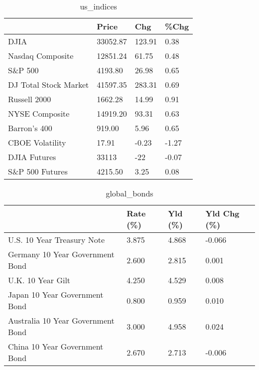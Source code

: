 \documentclass{article}%
\begin{document}
%


\begin{table}[htbp]%
\caption{us\_indices}%
\centering%
\begin{adjustbox}{width=1\textwidth}%
\begin{tabular}{llll}
\toprule
                      &    Price &    Chg &  \%Chg \\
\midrule
                 DJIA & 33052.87 & 123.91 &  0.38 \\
     Nasdaq Composite & 12851.24 &  61.75 &  0.48 \\
              S\&P 500 &  4193.80 &  26.98 &  0.65 \\
DJ Total Stock Market & 41597.35 & 283.31 &  0.69 \\
         Russell 2000 &  1662.28 &  14.99 &  0.91 \\
       NYSE Composite & 14919.20 &  93.31 &  0.63 \\
         Barron's 400 &   919.00 &   5.96 &  0.65 \\
      CBOE Volatility &    17.91 &  -0.23 & -1.27 \\
         DJIA Futures &    33113 &    -22 & -0.07 \\
      S\&P 500 Futures &  4215.50 &   3.25 &  0.08 \\
\bottomrule
\end{tabular}
%
\end{adjustbox}%
\end{table}

%


\begin{table}[htbp]%
\caption{global\_bonds}%
\centering%
\begin{adjustbox}{width=1\textwidth}%
\begin{tabular}{llll}
\toprule
                                  & Rate (\%) & Yld (\%) & Yld Chg (\%) \\
\midrule
       U.S. 10 Year Treasury Note &    3.875 &   4.868 &      -0.066 \\
  Germany 10 Year Government Bond &    2.600 &   2.815 &       0.001 \\
                U.K. 10 Year Gilt &    4.250 &   4.529 &       0.008 \\
    Japan 10 Year Government Bond &    0.800 &   0.959 &       0.010 \\
Australia 10 Year Government Bond &    3.000 &   4.958 &       0.024 \\
    China 10 Year Government Bond &    2.670 &   2.713 &      -0.006 \\
\bottomrule
\end{tabular}
%
\end{adjustbox}%
\end{table}
\end{document}
